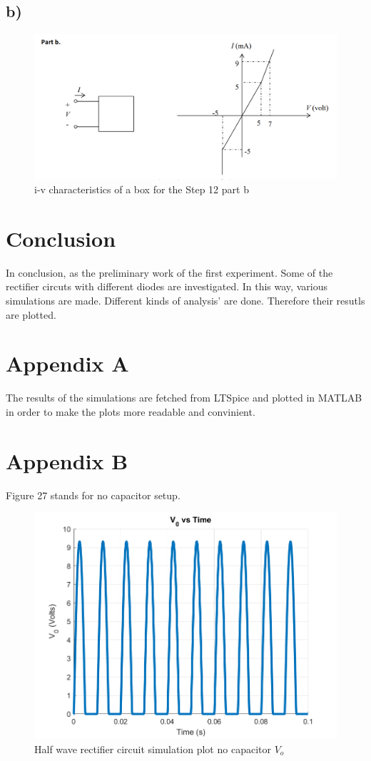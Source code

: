 \documentclass[letterpaper,12pt]{article}
\begin{document}
\subsection{b)}
\begin{figure}[H]
    \centering
   \includegraphics[width=1\textwidth]{12_2.png}
   \caption{i-v characteristics of a box for the Step 12 part b}
\end{figure} 
\fi
\section{Conclusion}
In conclusion, as the preliminary work of the first experiment. Some of the rectifier circuts with different diodes are investigated. In this way, various simulations are made. Different kinds of analysis' are done. Therefore their resutls are plotted.
\section*{Appendix A}
The results of the simulations are fetched from LTSpice and plotted in MATLAB in order to make the plots more readable and convinient.
\section*{Appendix B} \label{AB}
Figure 27 stands for no capacitor setup.
\begin{figure}[H]
    \centering
   \includegraphics[width=1\textwidth]{6_0F.png}
   \caption{Half wave rectifier circuit simulation plot no capacitor \(V_o\) }
\end{figure} 
\end{document}
